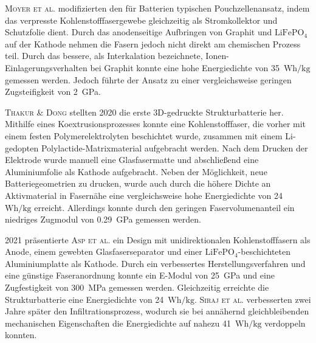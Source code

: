 \textsc{Moyer et al.} \cite{Moyer2020} modifizierten den für Batterien typischen Pouchzellenansatz, indem das verpresste Kohlenstofffasergewebe gleichzeitig als Stromkollektor und Schutzfolie dient. Durch das anodenseitige Aufbringen von Graphit und $\text{LiFePO}_\text{4}$ auf der Kathode nehmen die Fasern jedoch nicht direkt am chemischen Prozess teil. Durch das bessere, als Interkalation bezeichnete, Ionen-Einlagerungsverhalten bei Graphit konnte eine hohe Energiedichte von 35~$\si{\watt \hour \per \kg}$ gemessen werden. Jedoch führte der Ansatz zu einer vergleichsweise geringen Zugsteifigkeit von 2~GPa.

\textsc{Thakur \& Dong} \cite{Thakur2020} stellten 2020 die erste 3D-gedruckte Strukturbatterie her. Mithilfe eines Koextrusionsprozesses konnte eine Kohlenstofffaser, die vorher mit einem festen Polymerelektrolyten beschichtet wurde, zusammen mit einem Li-gedopten Polylactide-Matrixmaterial aufgebracht werden. Nach dem Drucken der Elektrode wurde manuell eine Glasfasermatte und abschließend eine Aluminiumfolie als Kathode aufgebracht. Neben der Möglichkeit, neue Batteriegeometrien zu drucken, wurde auch durch die höhere Dichte an Aktivmaterial in Fasernähe eine vergleichsweise hohe Energiedichte von 24~$\si{\watt \hour \per \kg}$ erreicht. Allerdings konnte durch den geringen Faservolumenanteil ein niedriges Zugmodul von 0.29~GPa gemessen werden.

2021 präsentierte \textsc{Asp et al.} \cite{Asp2021} ein Design mit unidirektionalen Kohlenstofffasern als Anode, einem gewebten Glasfaserseparator und einer $\text{LiFePO}_\text{4}$-beschichteten Aluminiumplatte als Kathode. Durch ein verbessertes Herstellungsverfahren und eine günstige Faseranordnung konnte ein E-Modul von 25~GPa und eine Zugfestigkeit von 300~MPa gemessen werden. Gleichzeitig erreichte die Strukturbatterie eine Energiedichte von 24~$\si{\watt \hour \per \kg}$. \textsc{Siraj et al.} \cite{Siraj2023} verbesserten zwei Jahre später den Infiltrationsprozess, wodurch sie bei annähernd gleichbleibenden mechanischen Eigenschaften die Energiedichte auf nahezu 41~$\si{\watt \hour \per \kg}$ verdoppeln konnten.



